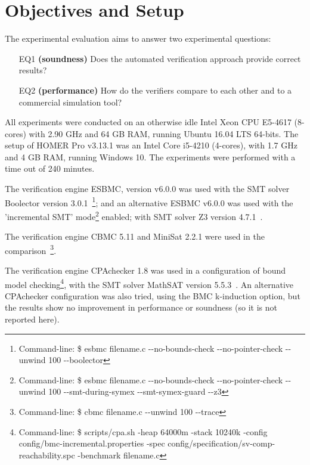 \section{Objectives and Setup}
\label{sec:setup}

The experimental evaluation aims to answer two experimental questions:
%
\begin{enumerate}
\item[EQ1] \textbf{(soundness)} Does the automated verification approach provide correct results?
\item[EQ2] \textbf{(performance)} How do the verifiers compare to each other and to a commercial simulation tool?
\end{enumerate}

%
All experiments were conducted on an otherwise idle Intel Xeon CPU E5-4617 (8-cores) with 2.90 GHz and 64 GB RAM, running Ubuntu 16.04 LTS 64-bits. The setup of HOMER Pro v3.13.1 was an Intel Core i5-4210 (4-cores), with 1.7 GHz and 4 GB RAM, running Windows 10. The experiments were performed with a time out of 240 minutes.

The verification engine ESBMC, version v6.0.0 was used with the SMT solver Boolector version 3.0.1~\cite{Brummayer}\footnote{Command-line: \$ esbmc filename.c -\phantom{}-no-bounds-check -\phantom{}-no-pointer-check -\phantom{}-unwind 100 -\phantom{}-boolector}; and an alternative ESBMC v6.0.0 was used with the 'incremental SMT' mode\footnote{Command-line: \$ esbmc filename.c -\phantom{}-no-bounds-check -\phantom{}-no-pointer-check -\phantom{}-unwind 100 -\phantom{}-smt-during-symex -\phantom{}-smt-symex-guard -\phantom{}-z3} enabled; with SMT solver Z3 version 4.7.1~\cite{DeMoura}. %

The verification engine CBMC 5.11 and MiniSat 2.2.1 were used in the comparison~\cite{Kroening}\footnote{Command-line: \$ cbmc filename.c -\phantom{}-unwind 100 -\phantom{}-trace}.
 
The verification engine CPAchecker 1.8 was used in a configuration of bound model checking\footnote{Command-line: \$ scripts/cpa.sh -heap 64000m -stack 10240k -config config/bmc-incremental.properties -spec config/specification/sv-comp-reachability.spc -benchmark filename.c}, with the SMT solver MathSAT version 5.5.3~\cite{mathsat5}. An alternative CPAchecker configuration was also tried, using the BMC k-induction option, but the results show no improvement in performance or soundness (so it is not reported here).

